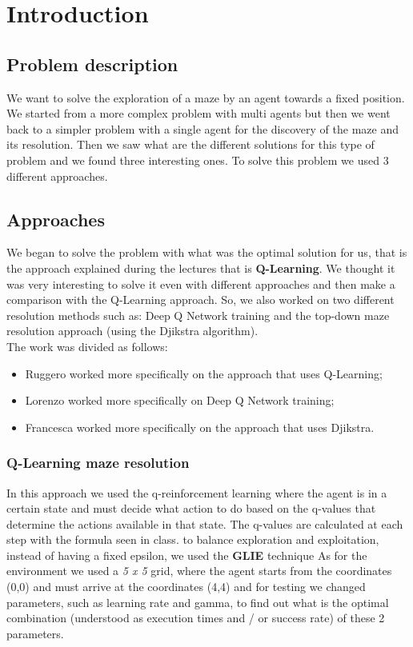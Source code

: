 \chapter{Introduction}


\section{Problem description}
We want to solve the exploration of a maze by an agent towards a fixed position.
We started from a more complex problem with multi agents but then we went back to a simpler problem with a single agent for the discovery of the maze and its resolution. Then we saw what are the different solutions for this type of problem and we found three interesting ones.
To solve this problem we used 3 different approaches.


\section{Approaches}

We began to solve the problem with what was the optimal solution for us, that is the approach explained during the lectures that is \textbf{Q-Learning}. We thought it was very interesting to solve it even with different approaches and then make a comparison with the Q-Learning approach. So, we also worked on two different resolution methods such as: Deep Q Network training and the top-down maze resolution approach (using the Djikstra algorithm).
\\
The work was divided as follows:
\begin{itemize}
\item Ruggero worked more specifically on the approach that uses Q-Learning;
\item Lorenzo worked more specifically on Deep Q Network training;
\item Francesca worked more specifically on the approach that uses Djikstra.

\end{itemize}




\subsection{Q-Learning maze resolution }
In this approach we used the q-reinforcement learning where the agent is in a certain state and must decide what action to do based on the q-values that determine the actions available in that state. 
The q-values are calculated at each step with the formula seen in class. 
to balance exploration and exploitation, instead of having a fixed epsilon, we used the \textbf{GLIE} technique
As for the environment we used a \textit{5 x 5} grid, where the agent starts from the coordinates (0,0) and must arrive at the coordinates (4,4) and for testing we changed parameters, such as learning rate and gamma, to find out what is the optimal combination (understood as execution times and / or success rate) of these 2 parameters.

